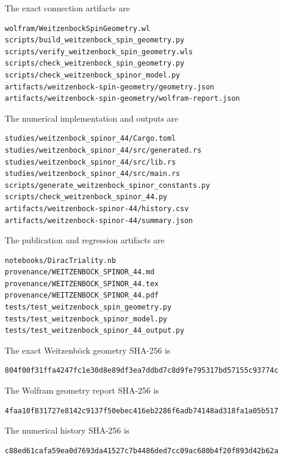 \documentclass[11pt]{article}
\begin{document}
The exact connection artifacts are

\begin{Verbatim}[fontsize=\small]
wolfram/WeitzenbockSpinGeometry.wl
scripts/build_weitzenbock_spin_geometry.py
scripts/verify_weitzenbock_spin_geometry.wls
scripts/check_weitzenbock_spin_geometry.py
scripts/check_weitzenbock_spinor_model.py
artifacts/weitzenbock-spin-geometry/geometry.json
artifacts/weitzenbock-spin-geometry/wolfram-report.json
\end{Verbatim}

The numerical implementation and outputs are

\begin{Verbatim}[fontsize=\small]
studies/weitzenbock_spinor_44/Cargo.toml
studies/weitzenbock_spinor_44/src/generated.rs
studies/weitzenbock_spinor_44/src/lib.rs
studies/weitzenbock_spinor_44/src/main.rs
scripts/generate_weitzenbock_spinor_constants.py
scripts/check_weitzenbock_spinor_44.py
artifacts/weitzenbock-spinor-44/history.csv
artifacts/weitzenbock-spinor-44/summary.json
\end{Verbatim}

The publication and regression artifacts are

\begin{Verbatim}[fontsize=\small]
notebooks/DiracTriality.nb
provenance/WEITZENBOCK_SPINOR_44.md
provenance/WEITZENBOCK_SPINOR_44.tex
provenance/WEITZENBOCK_SPINOR_44.pdf
tests/test_weitzenbock_spin_geometry.py
tests/test_weitzenbock_spinor_model.py
tests/test_weitzenbock_spinor_44_output.py
\end{Verbatim}

The exact Weitzenböck geometry SHA-256 is

\begin{Verbatim}[fontsize=\small]
804f00f31ffa4247fc1e30d8e89df3ea7ddbd7c8d9fe795317bd57155c93774c
\end{Verbatim}

The Wolfram geometry report SHA-256 is

\begin{Verbatim}[fontsize=\small]
4faa10f831727e8142c9137f50ebec416eb2286f6adb74148ad318fa1a05b517
\end{Verbatim}

The numerical history SHA-256 is

\begin{Verbatim}[fontsize=\small]
c88ed61cafa59ea0d7693da41527c7b4486ded7cc09ac680b4f20f893d42b62a
\end{Verbatim}
\end{document}
